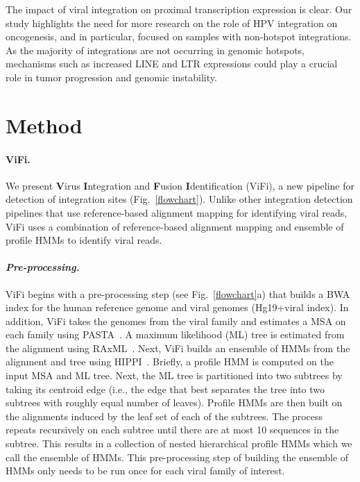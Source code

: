 \documentclass[10pt]{article}
\begin{document}
The impact of viral integration on proximal transcription expression is clear.  Our study highlights the need for more research on the role of HPV integration on oncogenesis, and in particular, focused on samples with non-hotspot integrations.  As the majority of integrations are not occurring in genomic hotspots, mechanisms such as increased LINE and LTR expressions could play a crucial role in tumor progression and genomic instability.  

 
\section{Method}
\paragraph{\textbf{ViFi.}}
We present \textbf{V}irus \textbf{I}ntegration and \textbf{F}usion \textbf{I}dentification (ViFi), a new pipeline for detection of integration sites (Fig.~\ref{flowchart}).  Unlike other integration detection pipelines that use reference-based alignment mapping for identifying viral reads, ViFi uses a combination of reference-based alignment mapping and ensemble of profile HMMs to identify viral reads.  

\paragraph{\emph{Pre-processing.}} ViFi begins with a pre-processing step (see Fig.~\ref{flowchart}a) that builds a BWA index for the human reference genome and viral genomes (Hg19+viral index).  In addition, ViFi takes the genomes from the viral family and estimates a MSA on each family using PASTA~\cite{Mirarab2014}.  A maximum likelihood (ML) tree is estimated from the alignment using RAxML~\cite{Stamatakis2014}.  Next, ViFi builds an ensemble of HMMs from the alignment and tree using HIPPI~\cite{Nguyen2016_hippi}.  Briefly, a profile HMM is computed on the input MSA and ML tree.  Next, the ML tree is partitioned into two subtrees by taking its centroid edge (i.e., the edge that best separates the tree into two subtrees with roughly equal number of leaves).  Profile HMMs are then built on the alignments induced by the leaf set of each of the subtrees.  The process repeats recursively on each subtree until there are at most 10 sequences in the subtree.  This results in a collection of nested hierarchical profile HMMs which we call the ensemble of HMMs.  This pre-processing step of building the ensemble of HMMs only needs to be run once for each viral family of interest.
\end{document}
